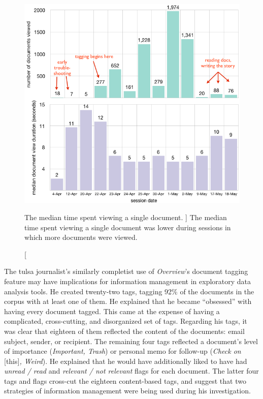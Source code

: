 \begin{figure}
    \centering
    \includegraphics[width=\textwidth]{figures/overview_jw_results.png}
    \caption
    [
        The median time spent viewing a single document.
    ]
    {
        The median time spent viewing a single document was lower during sessions in which more documents were viewed.
    }
    \label{fig:overview_jw_results}
    \centering
\end{figure}


The {\sc tulsa} journalist's similarly completist use of {\it Overview}'s document tagging feature may have implications for information management in exploratory data analysis tools. 
He created twenty-two tags, tagging 92\% of the documents in the corpus with at least one of them. 
He explained that he became ``obsessed'' with having every document tagged. 
This came at the expense of having a complicated, cross-cutting, and disorganized set of tags. 
Regarding his tags, it was clear that eighteen of them reflected the content of the documents: email subject, sender, or recipient. 
The remaining four tags reflected a document's level of importance ({\it Important, Trash}) or personal memo for follow-up ({\it Check on} [this]{\it, Weird}). 
He explained that he would have additionally liked to have had {\it unread / read} and {\it relevant / not relevant} flags for each document. 
The latter four tags and flags cross-cut the eighteen content-based tags, and suggest that two strategies of information management were being used during his investigation. 

